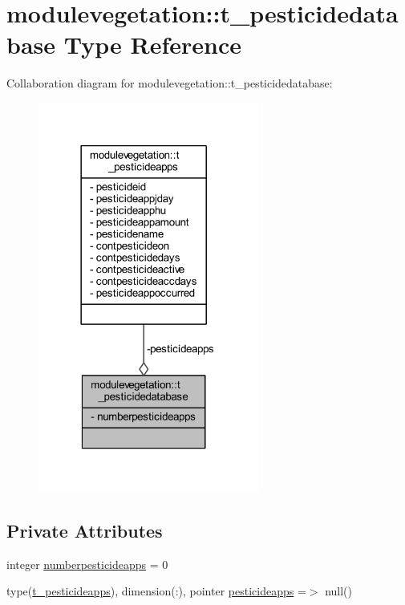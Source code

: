 \hypertarget{structmodulevegetation_1_1t__pesticidedatabase}{}\section{modulevegetation\+:\+:t\+\_\+pesticidedatabase Type Reference}
\label{structmodulevegetation_1_1t__pesticidedatabase}


Collaboration diagram for modulevegetation\+:\+:t\+\_\+pesticidedatabase\+:\nopagebreak
\begin{figure}[H]
\begin{center}
\leavevmode
\includegraphics[width=206pt]{structmodulevegetation_1_1t__pesticidedatabase__coll__graph}
\end{center}
\end{figure}
\subsection*{Private Attributes}
\begin{DoxyCompactItemize}
\item 
integer \mbox{\hyperlink{structmodulevegetation_1_1t__pesticidedatabase_acd5f1c1f199209c6f50cf2b397abec0a}{numberpesticideapps}} = 0
\item 
type(\mbox{\hyperlink{structmodulevegetation_1_1t__pesticideapps}{t\+\_\+pesticideapps}}), dimension(\+:), pointer \mbox{\hyperlink{structmodulevegetation_1_1t__pesticidedatabase_a846e29f9abf2154be19358f5114d9f99}{pesticideapps}} =$>$ null()
\end{DoxyCompactItemize}


